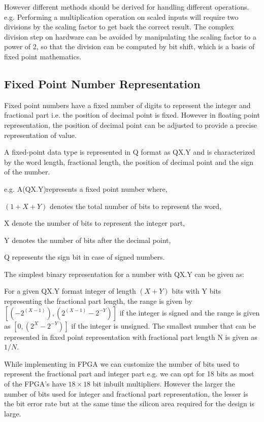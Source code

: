 \vspace{0.25cm}
\noindent However different methods should be derived for handling different operations. e.g. Performing a multiplication operation on scaled inputs will require two divisions by the scaling factor to get back the correct result. The complex division step on hardware can be avoided by manipulating the scaling factor to a power of 2, so that the division can be computed by bit shift, which is a basis of fixed point mathematics.

\subsection{Fixed Point Number Representation}
Fixed point numbers have a fixed number of digits to represent the integer and fractional part i.e. the position of decimal point is fixed. However in floating point representation, the position of decimal point can be adjusted to provide a precise representation of value.

A fixed-point data type is represented in Q format as QX.Y and is  characterized by the word length, fractional length, the position of decimal point and the sign of the number.

\vspace{0.25cm}
\noindent e.g. A(QX.Y)represents a fixed point number where,

\noindent$(1+X+Y)$ denotes the total number of bits to represent the word,

\noindent X denote the number of bits to represent the integer part,

\noindent Y denotes the number of bits after the decimal point,

\noindent Q represents the sign bit in case of signed numbers.

\vspace{0.25cm}
\noindent The simplest binary representation for a number with QX.Y can be given as:


For a given QX.Y format integer of length $(X+Y)$ bits with Y bits representing the fractional part length, the range is given by 
$[(-2^{(X-1)}),(2^{(X-1)}-2^{-Y})]$ if the integer is signed and the range is given as $[0,(2^{X}-2^{-Y})]$ if the integer is unsigned. The smallest number that can be represented in fixed point representation with fractional part length N is given as $1/N$.

\vspace{0.25cm}
While implementing in FPGA we can customize the number of bits used to represent the fractional part and integer part e.g. we can opt for 18 bits as most of the FPGA's have $18\times 18$ bit inbuilt multipliers. However the larger the number of bits used for integer and fractional part representation, the lesser is the bit error rate but at the same time the silicon area required for the design is large.

